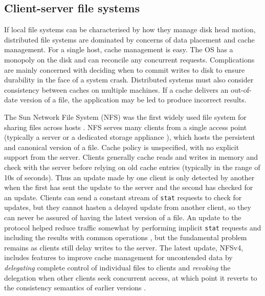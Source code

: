 \subsection{Client-server file systems}

If local file systems can be characterised by how they manage disk head motion, distributed file systems are dominated by concerns of data placement and cache management. For a single host, cache management is easy. The OS has a monopoly on the disk and can reconcile any concurrent requests. Complications are mainly concerned with deciding when to commit writes to disk to ensure durability in the face of a system crash. Distributed systems must also consider consistency between caches on multiple machines. If a cache delivers an out-of-date version of a file, the application may be led to produce incorrect results.

The Sun Network File System (NFS) was the first widely used file system for sharing files across hosts \cite{sandberg}. NFS serves many clients from a single access point (typically a server or a dedicated storage appliance \cite{hitz}), which hosts the persistent and canonical version of a file. Cache policy is unspecified, with no explicit support from the server. Clients generally cache reads and writes in memory and check with the server before relying on old cache entries (typically in the range of 10s of seconds). Thus an update made by one client is only detected by another when the first has sent the update to the server and the second has checked for an update. Clients can send a constant stream of \texttt{stat} requests to check for updates, but they cannot hasten a delayed update from another client, so they can never be assured of having the latest version of a file. An update to the protocol helped reduce traffic somewhat by performing implicit \texttt{stat} requests and including the results with common operations \cite{pawlowski,callaghan}, but the fundamental problem remains as clients still delay writes to the server. The latest update, NFSv4, includes features to improve cache management for uncontended data by \emph{delegating} complete control of individual files to clients and \emph{revoking} the delegation when other clients seek concurrent access, at which point it reverts to the consistency semantics of earlier versions \cite{shepler}.

